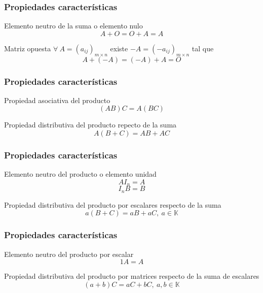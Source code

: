 \documentclass[12pt]{article}
\begin{document}
  
   \begin{frame}
  \frametitle{Propiedades caracter\'isticas}
  
   \begin{block}{Elemento neutro de la suma o elemento nulo}
   \[A+O = O+A = A\]
  \end{block}
  
  
     \begin{block}{Matriz opuesta}
   $\forall \ A = (a_{ij})_{m\times n}$ existe $-A = (-a_{ij})_{m\times n}$ tal que \[A+(-A) = (-A)+A = O\]
  \end{block}
 \end{frame}
 
 
 
   \begin{frame}
  \frametitle{Propiedades caracter\'isticas}
  
   \begin{block}{Propiedad asociativa del producto}
   \[(AB)C = A(BC)\]
  \end{block}
  
  
     \begin{block}{Propiedad distributiva del producto repecto de la suma}
   \[A(B+C) = AB+AC\]
  \end{block}
  
  
 \end{frame}
 
  
   \begin{frame}
  \frametitle{Propiedades caracter\'isticas}
  
   \begin{block}{Elemento neutro del producto o elemento unidad}
   \[AI_n = A \]
   \[I_nB = B\]
  \end{block}
  
  
     \begin{block}{Propiedad distributiva del producto por escalares respecto de la suma}
   \[a(B+C) = aB + aC,\ a\in \mathbb{K} \]
  \end{block}
  
  
 \end{frame}
 
   
   \begin{frame}
  \frametitle{Propiedades caracter\'isticas}
  
   \begin{block}{Elemento neutro del producto por escalar}
   \[1A = A \]
  \end{block}
  
  
     \begin{block}{Propiedad distributiva del producto por matrices respecto de la suma de escalares}
   \[(a+b)C = aC + bC, \ a,b\in\mathbb{K}\]
  \end{block}
  
  
 \end{frame}
 
\end{document}
